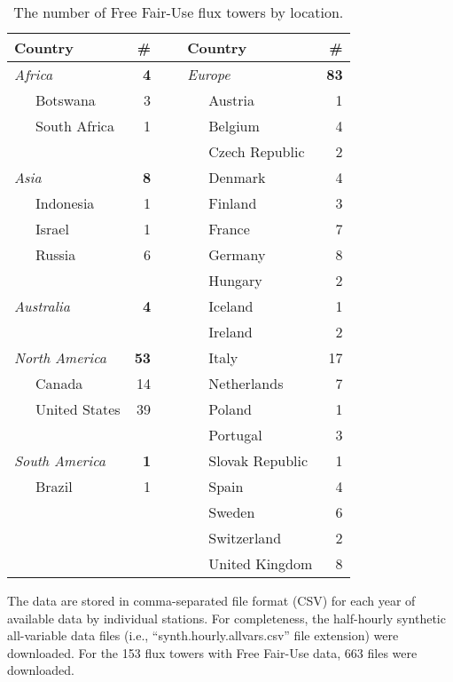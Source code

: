 \begin{table}[h]
    \caption{The number of Free Fair-Use flux towers by location.}
    \label{tab:freefairuse}
    \centering
    \begin{tabular}{l l r c l l r}
        \hline
        \multicolumn{2}{l}{\bf Country} & {\bf \#} & ~ & \multicolumn{2}{l}{\bf Country} & {\bf \#}\\
        \hline
         \multicolumn{2}{l}{\emph{Africa}} & {\bf 4} & ~ & \multicolumn{2}{l}{\emph{Europe}}  & {\bf 83}\\ 
         ~ & Botswana & 3 & ~ & ~ & Austria & 1\\ 
         ~ & South Africa & 1 & ~ & ~ & Belgium & 4\\ 
         ~ & ~ & ~ & ~ & ~ & Czech Republic & 2\\
         \multicolumn{2}{l}{\emph{Asia}} &  {\bf 8} & ~ & ~ & Denmark & 4\\
         ~ & Indonesia & 1 & ~ & ~ & Finland & 3\\
         ~ & Israel & 1 & ~ & ~ & France & 7 \\
         ~ & Russia & 6 & ~ & ~ & Germany & 8\\
         ~ & ~ & ~ & ~ & ~ & Hungary & 2 \\
         \multicolumn{2}{l}{\emph{Australia}} & {\bf 4} & ~ & ~ & Iceland & 1 \\
          ~ & ~ & ~ & ~ & ~ & Ireland & 2\\
           \multicolumn{2}{l}{\emph{North America}} & {\bf 53} & ~ & ~ & Italy & 17\\
         ~ & Canada & 14 & ~ & ~ & Netherlands & 7\\
         ~ & United States & 39 & ~ & ~ & Poland & 1\\
         ~ & ~ & ~ & ~ & ~ & Portugal & 3\\
         \multicolumn{2}{l}{\emph{South America}} & {\bf 1} & ~ & ~ & Slovak Republic & 1\\
         ~ & Brazil & 1 & ~ & ~ & Spain & 4 \\
         ~ & ~ & ~ & ~ & ~ & Sweden & 6\\
         ~ & ~ & ~ & ~ & ~ & Switzerland & 2 \\
         ~ & ~ & ~ & ~ & ~ & United Kingdom & 8\\
        \hline
    \end{tabular}
\end{table}

The data are stored in comma-separated file format (CSV) for each year of available data by individual stations.  
For completeness, the half-hourly synthetic all-variable data files (i.e., ``synth.hourly.allvars.csv'' file extension) were downloaded.  
For the 153 flux towers with Free Fair-Use data, 663 files were downloaded.  

